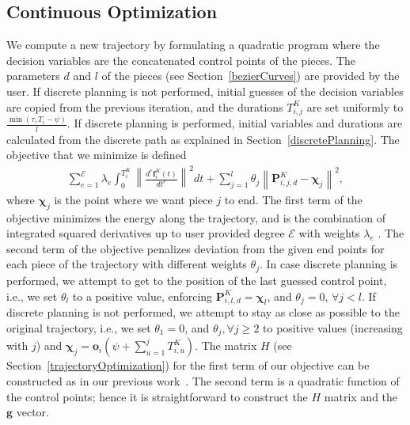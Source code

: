 \documentclass{svproc}
\newcommand{\vP}{\mathbf{P}}
\newcommand{\vg}{\mathbf{g}}
\newcommand{\vf}{\mathbf{f}}
\newcommand{\vo}{\mathbf{o}}
\newcommand{\vchi}{\mathbf{\chi}}
\newcommand{\cE}{\mathcal{E}}
\begin{document}

\subsection{Continuous Optimization}\label{continuousOptimization}
We compute a new trajectory by formulating a quadratic program where the decision variables are the concatenated control points of the pieces.
The parameters $d$ and $l$ of the pieces (see Section~\ref{bezierCurves}) are provided by the user.
If discrete planning is not performed, initial guesses of the decision variables are copied from the previous iteration, and the durations $T^{K}_{i,j}$ are set uniformly to $\frac{\min(\tau,T_i-\psi)}{l}$.
If discrete planning is performed, initial variables and durations are calculated from the discrete path as explained in Section~\ref{discretePlanning}.
The objective that we minimize is defined 
\begin{align}
    \sum_{e=1}^{\cE} \lambda_e\int_{0}^{T^K_i} \left\|\frac{d^e\vf^{K}_i(t)}{dt^e}\right\|^2dt + \sum_{j=1}^{l} \theta_j \left\|\vP^{K}_{i,j,d} - \vchi_{j}\right\|^2, \label{costFunction}
\end{align}
where $\vchi_j$ is the point  where we want piece $j$ to end.
The first term of the objective minimizes the energy along the trajectory, and is the combination of integrated squared derivatives up to user provided degree $\cE$ with weights $\lambda_e$ \cite{crazyplanning-ieeetro,richterISRR}.
The second term of the objective penalizes deviation from the given end points for each piece of the trajectory with different weights $\theta_j$.
In case discrete planning is performed, we attempt to get to the position of the last guessed control point, i.e., we set $\theta_l$ to a positive value, enforcing $\vP^K_{i,l,d} = \vchi_l$, and $\theta_j = 0,\,\forall j < l$.
If discrete planning is not performed, we attempt to stay as close as possible to the original trajectory, i.e.,  we set $\theta_1 = 0$, and $\theta_j, \forall j \geq 2$ to positive values (increasing with $j$) and $\vchi_j = \vo_i(\psi + \sum_{u=1}^j T^{K}_{i,u})$.
The matrix $H$ (see Section~\ref{trajectoryOptimization}) for the first term of our objective can be constructed as in our previous work~\cite{crazyplanning-ieeetro}.
The second term is a quadratic function of the control points; hence it is straightforward to construct the $H$ matrix and the $\vg$ vector.
\end{document}
